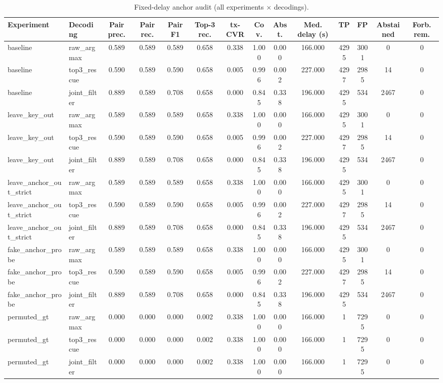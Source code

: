 \documentclass[journal]{IEEEtran}
\begin{document}
\begin{table}[!t]
\caption{Fixed-delay anchor audit (all experiments $\times$ decodings).}
\label{tab:S7}
\centering
\footnotesize
\setlength{\tabcolsep}{3pt}
\begin{tabular}{p{}p{}cccccccccccc}
\toprule
Experiment & Decoding & Pair prec. & Pair rec. & Pair F1 & Top-3 rec. & tx-CVR & Cov. & Abst. & Med. delay (s) & TP & FP & Abstained & Forb. rem. \\
\midrule
baseline & raw\_argmax & 0.589 & 0.589 & 0.589 & 0.658 & 0.338 & 1.000 & 0.000 & 166.000 & 4295 & 3001 & 0 & 0 \\
baseline & top3\_rescue & 0.590 & 0.589 & 0.590 & 0.658 & 0.005 & 0.996 & 0.002 & 227.000 & 4297 & 2985 & 14 & 0 \\
baseline & joint\_filter & 0.889 & 0.589 & 0.708 & 0.658 & 0.000 & 0.845 & 0.338 & 196.000 & 4295 & 534 & 2467 & 0 \\
leave\_key\_out & raw\_argmax & 0.589 & 0.589 & 0.589 & 0.658 & 0.338 & 1.000 & 0.000 & 166.000 & 4295 & 3001 & 0 & 0 \\
leave\_key\_out & top3\_rescue & 0.590 & 0.589 & 0.590 & 0.658 & 0.005 & 0.996 & 0.002 & 227.000 & 4297 & 2985 & 14 & 0 \\
leave\_key\_out & joint\_filter & 0.889 & 0.589 & 0.708 & 0.658 & 0.000 & 0.845 & 0.338 & 196.000 & 4295 & 534 & 2467 & 0 \\
leave\_anchor\_out\_strict & raw\_argmax & 0.589 & 0.589 & 0.589 & 0.658 & 0.338 & 1.000 & 0.000 & 166.000 & 4295 & 3001 & 0 & 0 \\
leave\_anchor\_out\_strict & top3\_rescue & 0.590 & 0.589 & 0.590 & 0.658 & 0.005 & 0.996 & 0.002 & 227.000 & 4297 & 2985 & 14 & 0 \\
leave\_anchor\_out\_strict & joint\_filter & 0.889 & 0.589 & 0.708 & 0.658 & 0.000 & 0.845 & 0.338 & 196.000 & 4295 & 534 & 2467 & 0 \\
fake\_anchor\_probe & raw\_argmax & 0.589 & 0.589 & 0.589 & 0.658 & 0.338 & 1.000 & 0.000 & 166.000 & 4295 & 3001 & 0 & 0 \\
fake\_anchor\_probe & top3\_rescue & 0.590 & 0.589 & 0.590 & 0.658 & 0.005 & 0.996 & 0.002 & 227.000 & 4297 & 2985 & 14 & 0 \\
fake\_anchor\_probe & joint\_filter & 0.889 & 0.589 & 0.708 & 0.658 & 0.000 & 0.845 & 0.338 & 196.000 & 4295 & 534 & 2467 & 0 \\
permuted\_gt & raw\_argmax & 0.000 & 0.000 & 0.000 & 0.002 & 0.338 & 1.000 & 0.000 & 166.000 & 1 & 7295 & 0 & 0 \\
permuted\_gt & top3\_rescue & 0.000 & 0.000 & 0.000 & 0.002 & 0.338 & 1.000 & 0.000 & 166.000 & 1 & 7295 & 0 & 0 \\
permuted\_gt & joint\_filter & 0.000 & 0.000 & 0.000 & 0.002 & 0.338 & 1.000 & 0.000 & 166.000 & 1 & 7295 & 0 & 0 \\
\bottomrule
\end{tabular}
\end{table}
\end{document}
